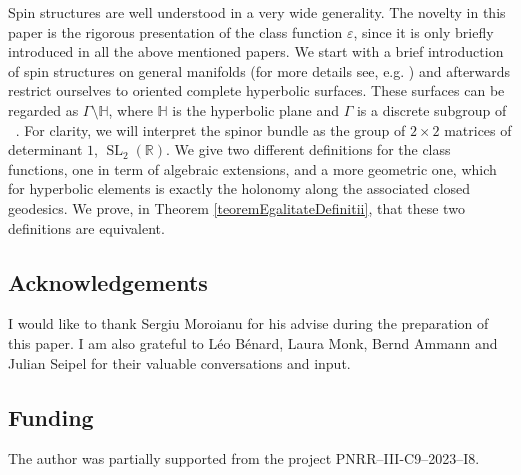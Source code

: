 \documentclass[12pt]{amsart}
\theoremstyle{definition}
\def\RR{{\mathbb R}}
\def\HH{{\mathbb{H}}}
\def\G{{\Gamma}}
\DeclareMathOperator{\psl}{PSL_2(\mathbb{R})}
\newcommand{\slinear}{\operatorname{SL}}
\begin{document}
Spin structures are well understood in a very wide generality. The novelty in this paper is the rigorous presentation of the class function $\varepsilon$, since it is only briefly introduced in all the above mentioned papers. We start with a brief introduction of spin structures on general manifolds (for more details see, e.g. \cite{carteMoroianuSpinori, hitchin, lawsonMichelsohn}) and afterwards restrict ourselves to oriented complete hyperbolic surfaces. These surfaces can be regarded as $\G\setminus \HH$, where $\HH$ is the hyperbolic plane and $\G$ is a discrete subgroup of $\psl$. For clarity, we will interpret the spinor bundle as the group of $2\times2$ matrices of determinant $1$, $\slinear_2(\RR)$. We give two different definitions for the class functions, one in term of algebraic extensions, and a more geometric one, which for hyperbolic elements is exactly the holonomy along the associated closed geodesics. We prove, in Theorem \ref{teoremEgalitateDefinitii}, that these two definitions are equivalent.

\subsection*{Acknowledgements} 
I would like to thank Sergiu Moroianu for his advise during the preparation of this paper. I am also grateful to Léo Bénard, Laura Monk, Bernd Ammann and Julian Seipel for their valuable conversations and input.

\subsection*{Funding}
The author was partially supported from the project PNRR–III-C9–2023–I8.
\end{document}
